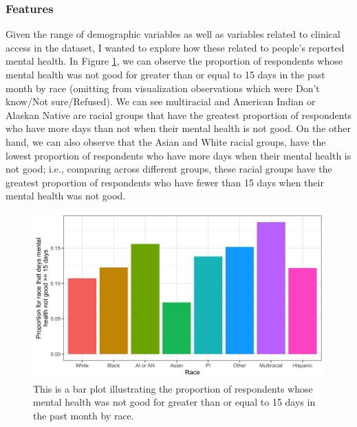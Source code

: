 \documentclass[
]{article}
\begin{document}
\hypertarget{features-1}{%
\subsubsection{Features}\label{features-1}}

Given the range of demographic variables as well as variables related to clinical access in the dataset, I wanted to explore how these related to people's reported mental health. In Figure \ref{fig:mental-health-vs-race}, we can observe the proportion of respondents whose mental health was not good for greater than or equal to 15 days in the past month by race (omitting from visualization observations which were Don't know/Not sure/Refused). We can see multiracial and American Indian or Alaskan Native are racial groups that have the greatest proportion of respondents who have more days than not when their mental health is not good. On the other hand, we can also observe that the Asian and White racial groups, have the lowest proportion of respondents who have more days when their mental health is not good; i.e., comparing across different groups, these racial groups have the greatest proportion of respondents who have fewer than 15 days when their mental health was not good.

\begin{figure}[H]

{\centering \includegraphics[width=0.8\linewidth]{../results/mental-health-vs-race} 

}

\caption{This is a bar plot illustrating the proportion of respondents whose mental health was not good for greater than or equal to 15 days in the past month by race.}\label{fig:mental-health-vs-race}
\end{figure}
\end{document}
